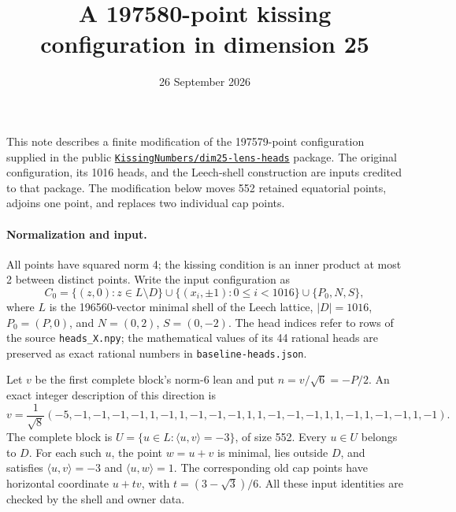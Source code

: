 \documentclass[11pt]{article}
\title{A 197580-point kissing configuration in dimension 25}
\author{}
\date{26 September 2026}
\newcommand{\ip}[2]{\langle #1,#2\rangle}
\begin{document}
\maketitle

\noindent
This note describes a finite modification of the 197579-point configuration
supplied in the public
\href{https://github.com/alexlegeartis/KissingNumbers/tree/cf14c5ef4db6059bbf2e570e3f0ce24edfda243e/verifications/improved/dim25-lens-heads}
{\texttt{KissingNumbers/dim25-lens-heads}} package.
The original configuration, its 1016 heads, and the Leech-shell construction
are inputs credited to that package. The modification below moves 552
retained equatorial points, adjoins one point, and replaces two individual
cap points.

\paragraph{Normalization and input.}
All points have squared norm 4; the kissing condition is an inner product
at most 2 between distinct points. Write the input configuration as
\[
 C_0=\{(z,0):z\in L\setminus D\}
 \cup\{(x_i,\pm1):0\le i<1016\}
 \cup\{P_0,N,S\},
\]
where $L$ is the 196560-vector minimal shell of the Leech lattice,
$|D|=1016$, $P_0=(P,0)$, and $N=(0,2)$, $S=(0,-2)$.
The head indices refer to rows of the source \texttt{heads\_X.npy}; the
mathematical values of its 44 rational heads are preserved as exact
rational numbers in \texttt{baseline-heads.json}.

Let $v$ be the first complete block's norm-6 lean and put $n=v/\sqrt6=-P/2$.
An exact integer description of this direction is
\[
v=\frac{1}{\sqrt8}(-5,-1,-1,-1,-1,1,-1,1,-1,-1,-1,1,
1,-1,-1,-1,1,1,-1,1,-1,-1,1,-1).
\]
The complete block is $U=\{u\in L:\ip uv=-3\}$, of size 552.
Every $u\in U$ belongs to $D$. For each such $u$, the point $w=u+v$ is
minimal, lies outside $D$, and satisfies $\ip uv=-3$ and $\ip uw=1$.
The corresponding old cap points have horizontal coordinate
$u+t v$, with $t=(3-\sqrt3)/6$.
All these input identities are checked by the shell and owner data.
\end{document}
